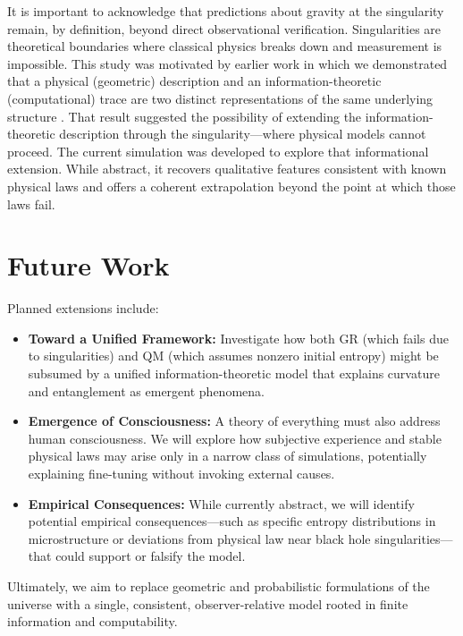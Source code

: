 \documentclass[11pt]{article}
\begin{document}
It is important to acknowledge that predictions about gravity at the singularity remain, by definition, beyond direct observational verification. Singularities are theoretical boundaries where classical physics breaks down and measurement is impossible. This study was motivated by earlier work in which we demonstrated that a physical (geometric) description and an information-theoretic (computational) trace are two distinct representations of the same underlying structure \cite{meskanen2020}. That result suggested the possibility of extending the information-theoretic description through the singularity—where physical models cannot proceed. The current simulation was developed to explore that informational extension. While abstract, it recovers qualitative features consistent with known physical laws and offers a coherent extrapolation beyond the point at which those laws fail.

\section{Future Work}

Planned extensions include:

\begin{itemize}
    \item \textbf{Toward a Unified Framework:} Investigate how both GR (which fails due to singularities) and QM (which assumes nonzero initial entropy) might be subsumed by a unified information-theoretic model that explains curvature and entanglement as emergent phenomena.

    \item \textbf{Emergence of Consciousness:} A theory of everything must also address human consciousness. We will explore how subjective experience and stable physical laws may arise only in a narrow class of simulations, potentially explaining fine-tuning without invoking external causes.

    \item \textbf{Empirical Consequences:} While currently abstract, we will identify potential empirical consequences—such as specific entropy distributions in microstructure or deviations from physical law near black hole singularities—that could support or falsify the model.
\end{itemize}

Ultimately, we aim to replace geometric and probabilistic formulations of the universe with a single, consistent, observer-relative model rooted in finite information and computability.
\end{document}
